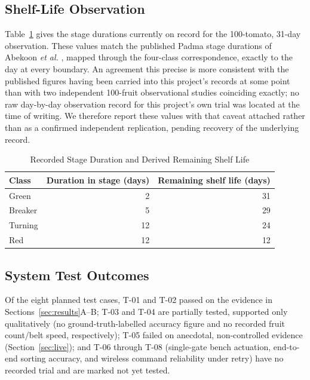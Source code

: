 \documentclass[journal]{IEEEtran}
\begin{document}
\subsection{Shelf-Life Observation}
Table~\ref{tab:shelfresults} gives the stage durations currently on record for the 100-tomato, 31-day observation. These values match the published Padma stage durations of Abekoon \textit{et al.} \cite{abekoon2024}, mapped through the four-class correspondence, exactly to the day at every boundary. An agreement this precise is more consistent with the published figures having been carried into this project's records at some point than with two independent 100-fruit observational studies coinciding exactly; no raw day-by-day observation record for this project's own trial was located at the time of writing. We therefore report these values with that caveat attached rather than as a confirmed independent replication, pending recovery of the underlying record.

\begin{table}[!t]
\caption{Recorded Stage Duration and Derived Remaining Shelf Life}
\label{tab:shelfresults}
\centering
\begin{tabular}{lrr}
\toprule
\textbf{Class} & \textbf{Duration in stage (days)} & \textbf{Remaining shelf life (days)} \\
\midrule
Green   & 2  & 31 \\
Breaker & 5  & 29 \\
Turning & 12 & 24 \\
Red     & 12 & 12 \\
\bottomrule
\end{tabular}
\end{table}

\subsection{System Test Outcomes}
Of the eight planned test cases, T-01 and T-02 passed on the evidence in Sections~\ref{sec:results}A--B; T-03 and T-04 are partially tested, supported only qualitatively (no ground-truth-labelled accuracy figure and no recorded fruit count/belt speed, respectively); T-05 failed on anecdotal, non-controlled evidence (Section~\ref{sec:live}); and T-06 through T-08 (single-gate bench actuation, end-to-end sorting accuracy, and wireless command reliability under retry) have no recorded trial and are marked not yet tested.
\end{document}
